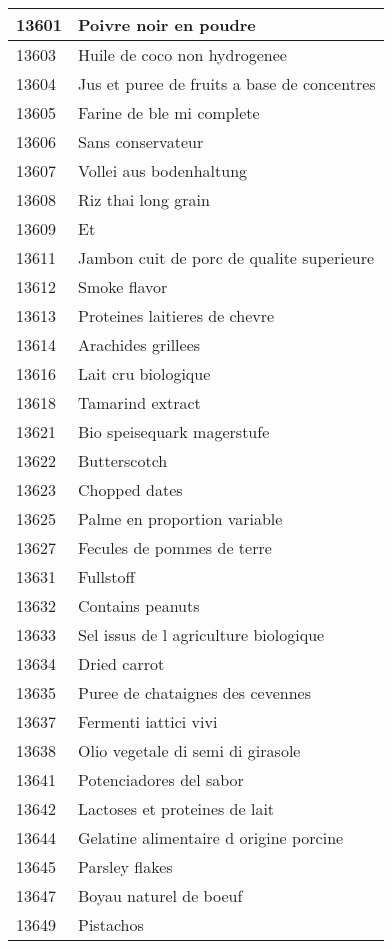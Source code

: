 \begin{longtable}{|l|l|}
13601 & Poivre noir en poudre \\ \hline 
13603 & Huile de coco non hydrogenee \\ \hline 
13604 & Jus et puree de fruits a base de concentres \\ \hline 
13605 & Farine de ble mi complete \\ \hline 
13606 & Sans conservateur \\ \hline 
13607 & Vollei aus bodenhaltung \\ \hline 
13608 & Riz thai long grain \\ \hline 
13609 & Et \\ \hline 
13611 & Jambon cuit de porc de qualite superieure \\ \hline 
13612 & Smoke flavor \\ \hline 
13613 & Proteines laitieres de chevre \\ \hline 
13614 & Arachides grillees \\ \hline 
13616 & Lait cru biologique \\ \hline 
13618 & Tamarind extract \\ \hline 
13621 & Bio speisequark magerstufe \\ \hline 
13622 & Butterscotch \\ \hline 
13623 & Chopped dates \\ \hline 
13625 & Palme en proportion variable \\ \hline 
13627 & Fecules de pommes de terre \\ \hline 
13631 & Fullstoff \\ \hline 
13632 & Contains peanuts \\ \hline 
13633 & Sel  issus de l agriculture biologique \\ \hline 
13634 & Dried carrot \\ \hline 
13635 & Puree de chataignes des cevennes \\ \hline 
13637 & Fermenti iattici vivi \\ \hline 
13638 & Olio vegetale di semi di girasole \\ \hline 
13641 & Potenciadores del sabor \\ \hline 
13642 & Lactoses et proteines de lait \\ \hline 
13644 & Gelatine alimentaire d origine porcine \\ \hline 
13645 & Parsley flakes \\ \hline 
13647 & Boyau naturel de boeuf \\ \hline 
13649 & Pistachos \\ \hline 

\end{longtable}
